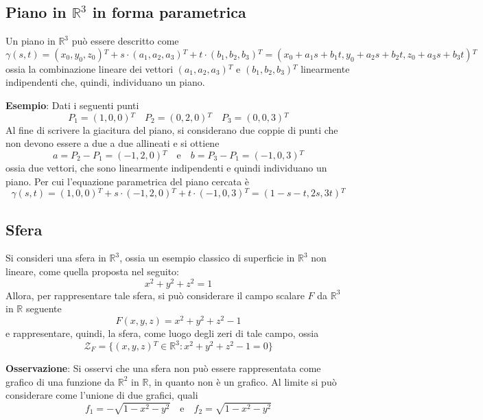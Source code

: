 \documentclass[a4paper]{extarticle}
\begin{document}
\vspace{1em}
\noindent
\subsection{Piano in $\mathbb{R}^3$ in forma parametrica}
Un piano in $\mathbb{R}^3$ può essere descritto come
\[\gamma(s,t) = (x_0,y_0,z_0){^T} + s \cdot (a_1,a_2,a_3){^T} + t \cdot (b_1,b_2,b_3){^T} = (x_0+a_1s+b_1t,y_0+a_2s+b_2t,z_0+a_3s+b_3t){^T}\]
ossia la combinazione lineare dei vettori $(a_1,a_2,a_3){^T}$ e $(b_1,b_2,b_3){^T}$ linearmente indipendenti che, quindi, individuano un piano.

\vspace{1em}
\noindent
\textbf{Esempio}: Dati i seguenti punti
\[P_1=(1,0,0){^T} \hspace{1em} P_2=(0,2,0){^T} \hspace{1em} P_3=(0,0,3){^T}\]
Al fine di scrivere la giacitura del piano, si considerano due coppie di punti che non devono essere a due a due allineati e si ottiene
\[a=P_2-P_1=(-1,2,0){^T} \hspace{1em} \text{e} \hspace{1em} b=P_3-P_1=(-1,0,3){^T}\]
ossia due vettori, che sono linearmente indipendenti e quindi individuano un piano. Per cui l'equazione parametrica del piano cercata è
\[\gamma(s,t)=(1,0,0){^T} + s \cdot (-1,2,0){^T} + t \cdot (-1,0,3){^T}=(1-s-t,2s,3t){^T}\]

\vspace{1em}
\noindent
\subsection{Sfera}
Si consideri una sfera in $\mathbb{R}^3$, ossia un esempio classico di superficie in $\mathbb{R}^3$ non lineare, come quella proposta nel seguito:
\[x^2+y^2+z^2=1\]
Allora, per rappresentare tale sfera, si può considerare il campo scalare $F$ da $\mathbb{R}^3$ in $\mathbb{R}$ seguente
\[F(x,y,z)=x^2+y^2+z^2-1\]
e rappresentare, quindi, la sfera, come luogo degli zeri di tale campo, ossia
\[\mathcal{Z}_F=\{(x,y,z){^T} \in \mathbb{R}^3 : x^2+y^2+z^2-1=0\}\]

\vspace{1em}
\noindent
\textbf{Osservazione}: Si osservi che una sfera non può essere rappresentata come grafico di una funzione da $\mathbb{R}^2$ in $\mathbb{R}$, in quanto non è un grafico. Al limite si può considerare come l'unione di due grafici, quali
\[f_1=-\sqrt{1-x^2-y^2} \hspace{1em} \text{e} \hspace{1em} f_2=\sqrt{1-x^2-y^2}\]
\end{document}
